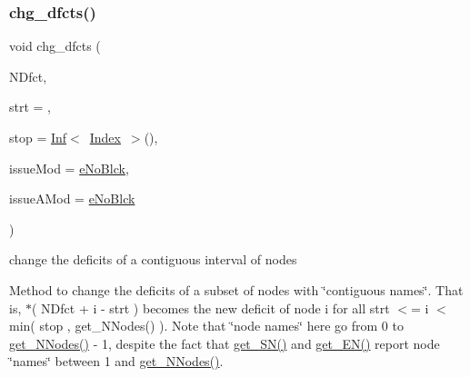 \subsubsection{\texorpdfstring{chg\+\_\+dfcts()}{chg\_dfcts()}\hspace{0.1cm}{\footnotesize\ttfamily [1/2]}}
{\footnotesize\ttfamily void chg\+\_\+dfcts (\begin{DoxyParamCaption}\item[{\mbox{\hyperlink{class_s_m_spp__di__unipi__it_1_1_m_c_f_block_a2871db0555b42b11ad5315c7f631473b}{c\+\_\+\+Vec\+\_\+\+F\+Number\+\_\+it}}}]{N\+Dfct,  }\item[{\mbox{\hyperlink{class_s_m_spp__di__unipi__it_1_1_m_c_f_block_aee6156e2ce80720d57a082d80f39d8cc}{c\+\_\+\+Index}}}]{strt = {},  }\item[{\mbox{\hyperlink{class_s_m_spp__di__unipi__it_1_1_m_c_f_block_ad53d6229d7ec28555a9c9c2fd9abf773}{Index}}}]{stop = {\ttfamily \mbox{\hyperlink{class_s_m_spp__di__unipi__it_1_1_inf}{Inf}}$<$~\mbox{\hyperlink{class_s_m_spp__di__unipi__it_1_1_m_c_f_block_ad53d6229d7ec28555a9c9c2fd9abf773}{Index}}~$>$()},  }\item[{\mbox{\hyperlink{group___modification___t_y_p_e_s_ga544246d8c462e9a2d817c2c30797968f}{c\+\_\+\+Mod\+Param}}}]{issue\+Mod = {\ttfamily \mbox{\hyperlink{group___modification___t_y_p_e_s_gga48fddcdd03a03f49b7e389ca1ed938d4ada69e89c5f46e563d8a13cfa6830c136}{e\+No\+Blck}}},  }\item[{\mbox{\hyperlink{group___modification___t_y_p_e_s_ga544246d8c462e9a2d817c2c30797968f}{c\+\_\+\+Mod\+Param}}}]{issue\+A\+Mod = {\ttfamily \mbox{\hyperlink{group___modification___t_y_p_e_s_gga48fddcdd03a03f49b7e389ca1ed938d4ada69e89c5f46e563d8a13cfa6830c136}{e\+No\+Blck}}} }\end{DoxyParamCaption})}



change the deficits of a contiguous interval of nodes 

Method to change the deficits of a subset of nodes with \char`\"{}contiguous
names\char`\"{}. That is, $\ast$( N\+Dfct + i -\/ strt ) becomes the new deficit of node i for all strt $<$= i $<$ min( stop , get\+\_\+\+N\+Nodes() ). Note that \char`\"{}node names\char`\"{} here go from 0 to \mbox{\hyperlink{class_s_m_spp__di__unipi__it_1_1_m_c_f_block_afff9080606a5612d33ba20c39d663839}{get\+\_\+\+N\+Nodes()}} -\/ 1, despite the fact that \mbox{\hyperlink{class_s_m_spp__di__unipi__it_1_1_m_c_f_block_a48ce277b5dac05d54aa2281fa4595c7b}{get\+\_\+\+S\+N()}} and \mbox{\hyperlink{class_s_m_spp__di__unipi__it_1_1_m_c_f_block_a34619412f7c801aadfa0b083a6efda36}{get\+\_\+\+E\+N()}} report node \char`\"{}names\char`\"{} between 1 and \mbox{\hyperlink{class_s_m_spp__di__unipi__it_1_1_m_c_f_block_afff9080606a5612d33ba20c39d663839}{get\+\_\+\+N\+Nodes()}}.

